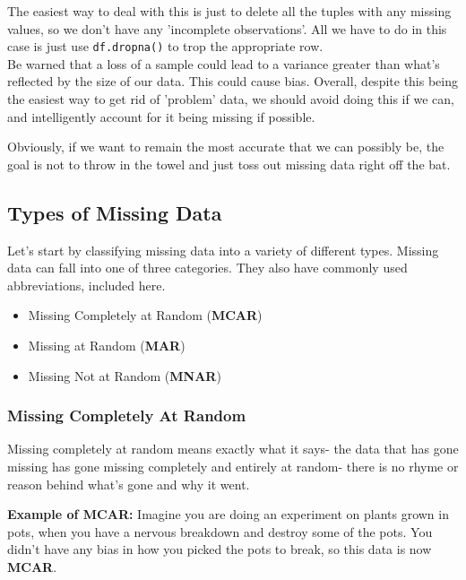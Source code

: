 \documentclass[english, 10pt]{article}
\begin{document}
The easiest way to deal with this is just to delete all the tuples with any missing values, so we don't have any 'incomplete observations'. All we have to do in this case is just use \texttt{df.dropna()} to trop the appropriate row.\\

Be warned that a loss of a sample could lead to a variance greater than what's reflected by the size of our data. This could cause bias. Overall, despite this being the easiest way to get rid of 'problem' data, we should avoid doing this if we can, and intelligently account for it being missing if possible.

Obviously, if we want to remain the most accurate that we can possibly be, the goal is not to throw in the towel and just toss out missing data right off the bat.

\subsection{Types of Missing Data}

Let's start by classifying missing data into a variety of different types. Missing data can fall into one of three categories. They also have commonly used abbreviations, included here.

\begin{itemize}
	\item Missing Completely at Random (\textbf{MCAR})
	\item Missing at Random (\textbf{MAR})
	\item Missing Not at Random (\textbf{MNAR})
\end{itemize}

\subsubsection{Missing Completely At Random}

Missing completely at random means exactly what it says- the data that has gone missing has gone missing completely and entirely at random- there is no rhyme or reason behind what's gone and why it went.\\

\begin{myproof}
\textbf{Example of MCAR:} Imagine you are doing an experiment on plants grown in pots, when you have a nervous breakdown and destroy some of the pots. You didn't have any bias in how you picked the pots to break, so this data is now \textbf{MCAR}.
\end{myproof}
\end{document}
